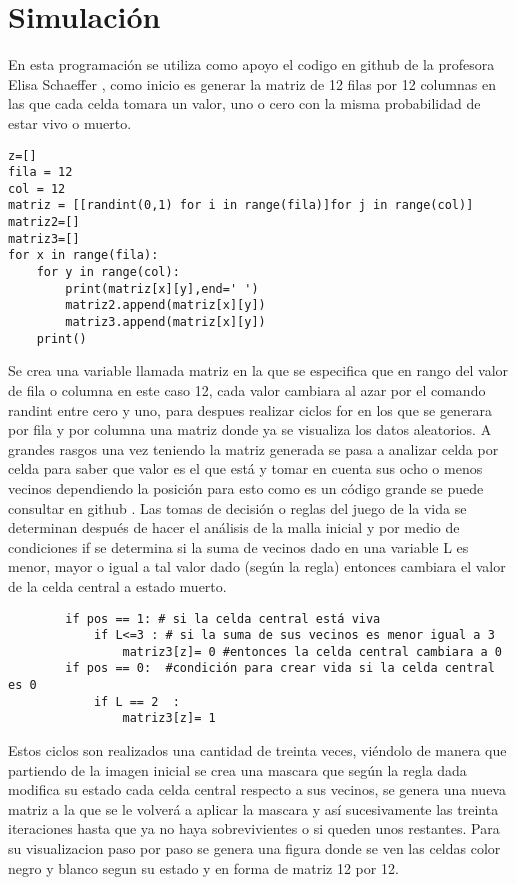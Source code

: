 \documentclass[a4paper, 11pt]{article}
\begin{document}
\section{Simulación}
En esta programación se utiliza como apoyo el codigo en github de la profesora Elisa Schaeffer \cite{dra}, como inicio es generar la matriz de 12 filas por 12 columnas en las que cada celda tomara un valor, uno o cero con la misma probabilidad de estar vivo o muerto. 
\begin{verbatim}
z=[]
fila = 12
col = 12
matriz = [[randint(0,1) for i in range(fila)]for j in range(col)]
matriz2=[]
matriz3=[]
for x in range(fila):
    for y in range(col):
        print(matriz[x][y],end=' ')
        matriz2.append(matriz[x][y])
        matriz3.append(matriz[x][y])        
    print()
\end{verbatim}
Se crea una variable llamada matriz en la que se especifica que en rango del valor de fila o columna en este caso 12, cada valor cambiara al azar por el comando randint entre cero y uno, para despues realizar ciclos for en los que se generara por fila y por columna una matriz donde ya se visualiza los datos aleatorios.
A grandes rasgos una vez teniendo la matriz generada se pasa a analizar celda por celda para saber que valor es el que está y tomar en cuenta sus ocho o menos vecinos dependiendo la posición para esto como es un código grande se puede consultar en github \cite{Edson}. Las tomas de decisión o reglas del juego de la vida se determinan después de hacer el análisis de la malla inicial y por medio de condiciones if se determina si la suma de vecinos dado en una variable L es menor, mayor o igual a tal valor dado (según la regla) entonces cambiara el valor de la celda central a estado muerto.
\begin{verbatim}
        if pos == 1: # si la celda central está viva 
            if L<=3 : # si la suma de sus vecinos es menor igual a 3
                matriz3[z]= 0 #entonces la celda central cambiara a 0
        if pos == 0:  #condición para crear vida si la celda central es 0 
            if L == 2  :  
                matriz3[z]= 1
\end{verbatim}
Estos ciclos son realizados una cantidad de treinta veces, viéndolo de manera que partiendo de la imagen inicial se crea una mascara que según la regla dada modifica su estado cada celda central respecto a sus vecinos, se genera una nueva matriz a la que se le volverá a aplicar la mascara y así sucesivamente las treinta iteraciones hasta que ya no haya sobrevivientes o si queden unos restantes. Para su visualizacion paso por paso se genera una figura donde se ven las celdas color negro y blanco segun su estado y en forma de matriz 12 por 12.
\end{document}
